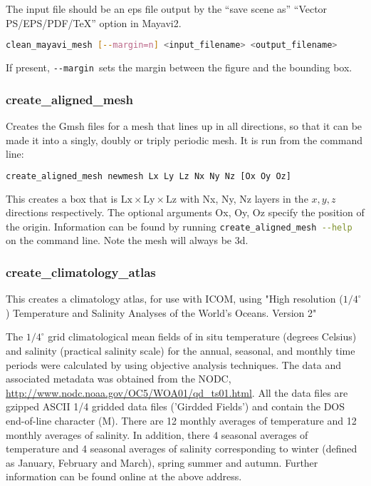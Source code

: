 The input file should be an eps file output by the ``save scene as''
``Vector PS/EPS/PDF/TeX'' option in Mayavi2.

\begin{lstlisting}[language = Bash]
clean_mayavi_mesh [--margin=n] <input_filename> <output_filename>
\end{lstlisting}

If present, \lstinline[language = Bash]+--margin+\ sets the margin between
the figure and the bounding box.


\subsubsection{create\_aligned\_mesh}
\label{sec:create_aligned_mesh}

Creates the Gmsh files for a mesh that lines up in all directions, so that it can be made it into a singly, doubly or triply periodic mesh. It is run from the command line:

\begin{lstlisting}[language = Bash]
create_aligned_mesh newmesh Lx Ly Lz Nx Ny Nz [Ox Oy Oz]
\end{lstlisting}

This creates a box that is $\mathrm{Lx} \times \mathrm{Ly} \times \mathrm{Lz}$ with Nx, Ny, Nz layers in the $x,y,z$ directions respectively. The optional arguments Ox, Oy, Oz  specify the position of the origin. Information can be found by running \lstinline[language = bash]+create_aligned_mesh --help+ on the command line. Note the mesh will always be 3d.


\subsubsection{create\_climatology\_atlas}
\label{sec:create_climatology_atlas}

This creates a climatology atlas, for use with ICOM, using "High resolution ($1/4 ^\circ$) Temperature and Salinity Analyses of the World's Oceans. Version 2"

The $1/4 ^\circ$ grid climatological mean fields of in situ temperature (degrees Celsius) and salinity (practical salinity scale) for the annual, seasonal, and monthly time periods were calculated by \cite{boyer2005} using objective analysis techniques. The data and associated metadata was obtained from the NODC, \url{http://www.nodc.noaa.gov/OC5/WOA01/qd_ts01.html}. All the data files are gzipped ASCII 1/4 gridded data files ('Girdded Fields') and contain the DOS end-of-line character (M). There are 12 monthly averages of temperature and 12 monthly averages of salinity. In addition, there 4 seasonal averages of temperature and 4 seasonal averages of salinity corresponding to winter (defined as January, February and March), spring summer and autumn. Further information can be found online at the above address.

